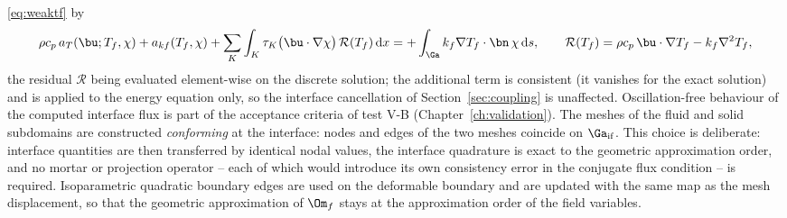 \eqref{eq:weaktf} by
\begin{equation}
\rho c_p\,a_T(\bu;T_f,\chi)+a_{kf}(T_f,\chi)
+\sum_{K}\int_{K}\tau_K\big(\bu\cdot\nabla\chi\big)\,
\mathcal R(T_f)\,\mathrm dx
=+\int_{\Ga}k_f\nabla T_f\cdot\bn\,\chi\,\mathrm ds,
\qquad
\mathcal R(T_f)=\rho c_p\,\bu\cdot\nabla T_f-k_f\nabla^2T_f,
\label{eq:supgwf}
\end{equation}
the residual $\mathcal R$ being evaluated element-wise on the discrete solution; the additional term
is consistent (it vanishes for the exact solution) and is applied to the energy equation only, so the
interface cancellation of Section~\ref{sec:coupling} is unaffected. Oscillation-free behaviour of the computed interface flux is
part of the acceptance criteria of test V-B (Chapter~\ref{ch:validation}). The meshes of the
fluid and solid subdomains are constructed \emph{conforming} at the interface: nodes and edges of
the two meshes coincide on $\Ga_{\mathrm{if}}$. This choice is deliberate: interface quantities are
then transferred by identical nodal values, the interface quadrature is exact to the geometric
approximation order, and no mortar or projection operator -- each of which would introduce its own
consistency error in the conjugate flux condition -- is required. Isoparametric quadratic boundary
edges are used on the deformable boundary and are updated with the same map as the mesh
displacement, so that the geometric approximation of $\Om_f$ stays at the approximation order of
the field variables.

